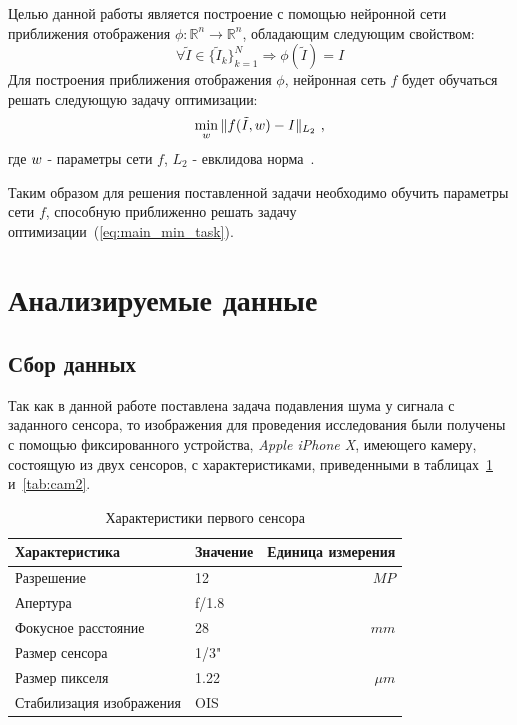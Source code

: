 \documentclass[14pt]{mmcs_article}
\begin{document}
Целью данной работы является построение с помощью нейронной сети приближения отображения $\phi: \mathbb{R}^n \longrightarrow \mathbb{R}^n$, обладающим следующим свойством:
\begin{equation}\label{eq:main_property}
\forall \tilde{I} \in \{\tilde{I}_k\}_{k=1}^{N} \Longrightarrow \phi(\tilde{I}) = I 
\end{equation}
Для построения приближения отображения $\phi$, нейронная сеть $f$ будет обучаться решать следующую задачу оптимизации:
\begin{eqnarray}\label{eq:main_min_task}
\min_{\mathnormal{w}} \Arrowvert f(\tilde{I}, \mathnormal{w}) - I \Arrowvert_{L_2}\text{ ,}
\end{eqnarray}
где $\mathnormal{w}$ - параметры сети $f$, $L_2$ - евклидова норма~\autocite{Haykin}.

Таким образом для решения поставленной задачи необходимо обучить параметры сети $f$, способную приближенно решать задачу оптимизации~(\ref{eq:main_min_task}).


\section{Анализируемые данные}\label{sec:our_data}
\subsection{Сбор данных}
Так как в данной работе поставлена задача подавления шума у сигнала с заданного сенсора, то изображения для проведения исследования были получены с помощью фиксированного устройства, \textit{Apple iPhone X}, имеющего камеру, состоящую из двух сенсоров, с характеристиками, приведенными в таблицах~\ref{tab:cam1} и~\ref{tab:cam2}.

\begin{table}[h!]
	\centering
	\caption{\label{tab:cam1}Характеристики первого сенсора}
	\begin{tabular}{llr}
		\hline
		Характеристика  & Значение    & Единица измерения \\
		\hline
		Разрешение & 12    & $MP$  \\
		Апертура & f/1.8 & \\
		Фокусное расстояние & 28 & $mm$ \\
		Размер сенсора & 1/3" & \\
		Размер пикселя & 1.22 & $\mu m$ \\
		Стабилизация изображения & OIS & \\
		\hline
	\end{tabular}
\end{table}
\end{document}
